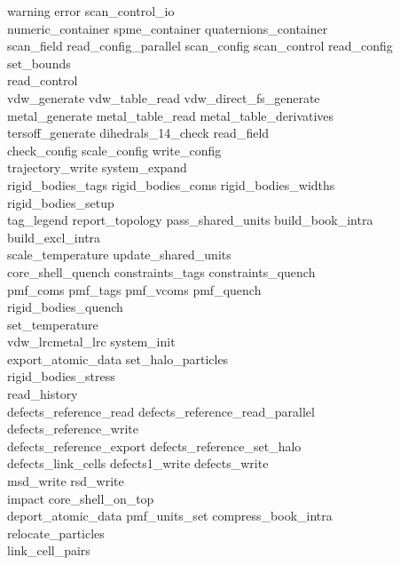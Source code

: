\begin{itemize}
{\sc
warning error scan\_control\_io \\
numeric\_container spme\_container quaternions\_container \\
scan\_field read\_config\_parallel scan\_config scan\_control read\_config \\
set\_bounds \\
read\_control \\
vdw\_generate vdw\_table\_read vdw\_direct\_fs\_generate \\
metal\_generate metal\_table\_read metal\_table\_derivatives \\
tersoff\_generate dihedrals\_14\_check read\_field \\
check\_config scale\_config write\_config \\
trajectory\_write system\_expand \\
rigid\_bodies\_tags rigid\_bodies\_coms rigid\_bodies\_widths \\
rigid\_bodies\_setup \\
tag\_legend report\_topology pass\_shared\_units build\_book\_intra \\
build\_excl\_intra \\
scale\_temperature update\_shared\_units \\
core\_shell\_quench constraints\_tags constraints\_quench \\
pmf\_coms pmf\_tags pmf\_vcoms pmf\_quench \\
rigid\_bodies\_quench \\
set\_temperature \\
vdw\_lrcmetal\_lrc system\_init \\
export\_atomic\_data set\_halo\_particles \\
rigid\_bodies\_stress \\
read\_history \\
defects\_reference\_read defects\_reference\_read\_parallel \\
defects\_reference\_write \\
defects\_reference\_export defects\_reference\_set\_halo \\
defects\_link\_cells defects1\_write defects\_write \\
msd\_write rsd\_write \\
impact core\_shell\_on\_top \\
deport\_atomic\_data pmf\_units\_set compress\_book\_intra \\
relocate\_particles \\
link\_cell\_pairs \\
}
\end{itemize}
